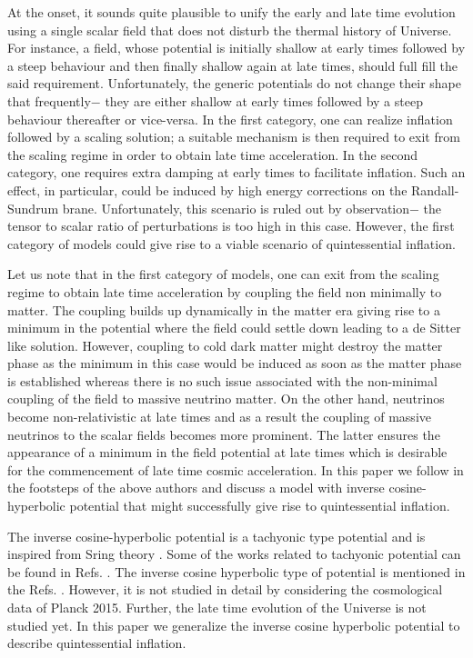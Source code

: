 \documentclass[prd,twocolumn,superscriptaddress]{revtex4}
\begin{document}
At the onset, it sounds quite plausible to unify the early and late
time evolution using a single scalar field that does not disturb the
thermal history of Universe. For instance, a field, whose potential
is initially shallow at early times followed by a steep behaviour and then finally shallow again
at late times, should full fill the said requirement. Unfortunately,
the generic potentials do not change their shape that frequently$-$
they are either shallow at early times followed by a steep behaviour
thereafter or vice-versa. In the first category, one can realize
inflation  followed by a scaling solution; a suitable mechanism is then required to
exit from the scaling regime in order to obtain late time acceleration. In the second
category, one requires extra damping at early times to facilitate
inflation. Such an effect, in particular, could be induced by high
energy corrections on the Randall-Sundrum brane. Unfortunately, this
scenario is ruled out by observation$-$ the tensor to scalar ratio
of perturbations is too high in this case. However, the first
category of models could  give rise to a viable scenario of
quintessential inflation.
 

Let us note that in the first category of models, one can  exit from the scaling regime to
obtain late time acceleration by coupling the field non minimally to matter. The coupling  builds up
dynamically in the matter era giving rise to a minimum in the 
potential where the field could settle down leading to a de Sitter like solution. 
However, coupling to cold dark matter might destroy the matter phase as the minimum in this case would be induced as soon as the matter phase is established whereas there is no such issue associated
with the non-minimal
coupling of the field to massive neutrino matter. On the other hand, neutrinos become non-relativistic at  late times
and as a result the coupling of massive neutrinos to the scalar fields becomes more prominent. The latter ensures the 
appearance of a minimum in the field potential at late times \cite{QIPlanck2015SamiWali,Hossain:2014xha, Amendola:2007yx} which 
is desirable for the commencement of late time cosmic acceleration. In this paper we follow in the footsteps of 
the above authors and discuss a model with inverse cosine-hyperbolic potential that might successfully 
give rise to quintessential inflation.

The inverse cosine-hyperbolic potential is a  tachyonic type potential  and is inspired from 
Sring theory \cite{Lambert:2003zr,Djordjevic:2016pdh}.   Some of the works related to tachyonic potential can be found in 
Refs. \cite{Sen:1999mg,Sen:2002nu}. The
inverse cosine hyperbolic type of potential is mentioned in the Refs.  \cite{Lambert:2003zr,Djordjevic:2016pdh}. However, it is not studied 
in detail by considering the cosmological data of Planck 2015. Further, the late time evolution of the Universe
is  not studied yet. In this paper we  generalize the inverse cosine hyperbolic potential to describe 
quintessential inflation.
\end{document}
